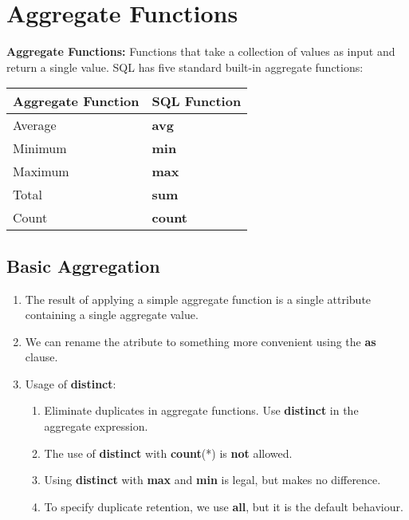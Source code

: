 \documentclass[journal,12pt,twocolumn]{IEEEtran}
\begin{document}
\section{Aggregate Functions}

\textbf{Aggregate Functions:} Functions that take a collection of values as 
input and return a single value. SQL has five standard built-in aggregate 
functions:

\begin{table}[!ht]
    \centering
    \begin{tabularx}{\columnwidth}{|X|X|}
        \hline
        \textbf{Aggregate Function} & \textbf{SQL Function} \\
        \hline 
        Average & \textbf{avg} \\
        \hline 
        Minimum & \textbf{min} \\
        \hline 
        Maximum & \textbf{max} \\
        \hline 
        Total & \textbf{sum} \\
        \hline 
        Count & \textbf{count} \\
        \hline
    \end{tabularx}
\end{table}

\subsection{Basic Aggregation}
\begin{enumerate}
    \item The result of applying a simple aggregate function is a single 
    attribute containing a single aggregate value.
    \item We can rename the atribute to something more convenient using the 
    \textbf{as} clause.
    \item Usage of \textbf{distinct}:
    \begin{enumerate}
        \item Eliminate duplicates in aggregate functions. Use \textbf{distinct}
        in the aggregate expression.
        \item The use of \textbf{distinct} with \textbf{count}(*) is \textbf{not}
        allowed.
        \item Using \textbf{distinct} with \textbf{max} and \textbf{min} is 
        legal, but makes no difference.
        \item To specify duplicate retention, we use \textbf{all}, but it is 
        the default behaviour.
    \end{enumerate}
\end{enumerate}
\end{document}
